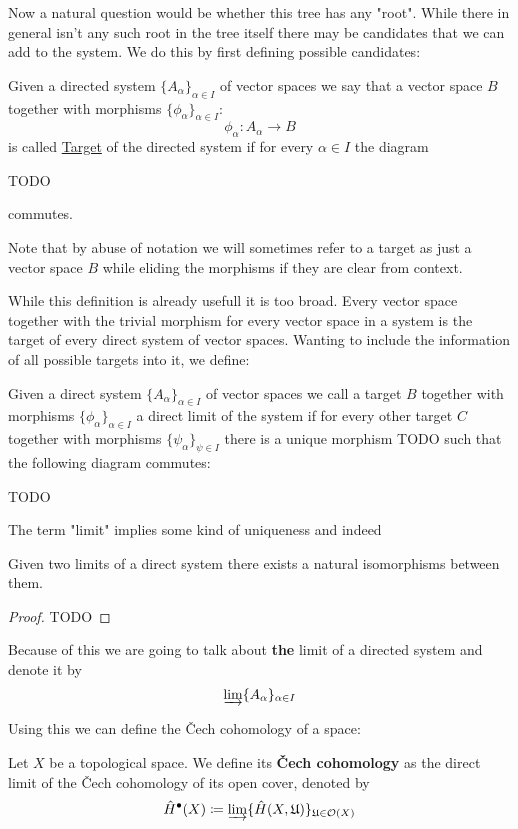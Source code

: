 Now a natural question would be whether this tree has any "root". While there in general
isn't any such root in the tree itself there may be candidates that we can add to the
system. We do this by first defining possible candidates:
\begin{definition}[Target]
	Given a directed system $\{A_\alpha\}_{\alpha \in I}$ of vector spaces we say
	that a vector space $B$ together with morphisms $\{\phi_\alpha\}_{\alpha \in I}$:
	\[
		\phi_\alpha: A_\alpha \to B	
	\]
	is called \underline{Target} of the directed system if for every $\alpha \in I$ 
	the diagram

	TODO

	commutes.
\end{definition}
Note that by abuse of notation we will sometimes refer to a target as just a vector space
$B$ while eliding the morphisms if they are clear from context.

While this definition is already usefull it is too broad. Every vector space together with
the trivial morphism for every vector space in a system is the target of every direct system of vector spaces.
Wanting to include the information of all possible targets into it, we define:
\begin{definition}
Given a direct system $\{A_\alpha\}_{\alpha \in I}$ of vector spaces we call a target
$B$ together with morphisms $\{\phi_\alpha\}_{\alpha \in I}$ a direct limit of the system
if for every other target $C$ together with morphisms $\{\psi_\alpha\}_{\psi \in I}$ there
is a unique morphism TODO such that the following diagram commutes:

TODO
\end{definition}
The term "limit" implies some kind of uniqueness and indeed
\begin{lemma}
Given two limits of a direct system there exists a natural isomorphisms between them.
\end{lemma}
\begin{proof}
TODO
\end{proof}
Because of this we are going to talk about \textbf{the} limit of a directed system
and denote it by
\[
	\varinjlim \{A_\alpha\}_{\alpha \in I}
\]

Using this we can define the Čech cohomology of a space:
\begin{definition}
Let $X$ be a topological space. We define its \textbf{Čech cohomology} as the direct limit
of the Čech cohomology of its open cover, denoted by
\[
	\hat{H}^\bullet(X) \coloneqq \varinjlim \{\hat{H}(X, \mathfrak{U})\}_{\mathfrak{U} \in \mathcal{O}(X)}
\]
\end{definition}

